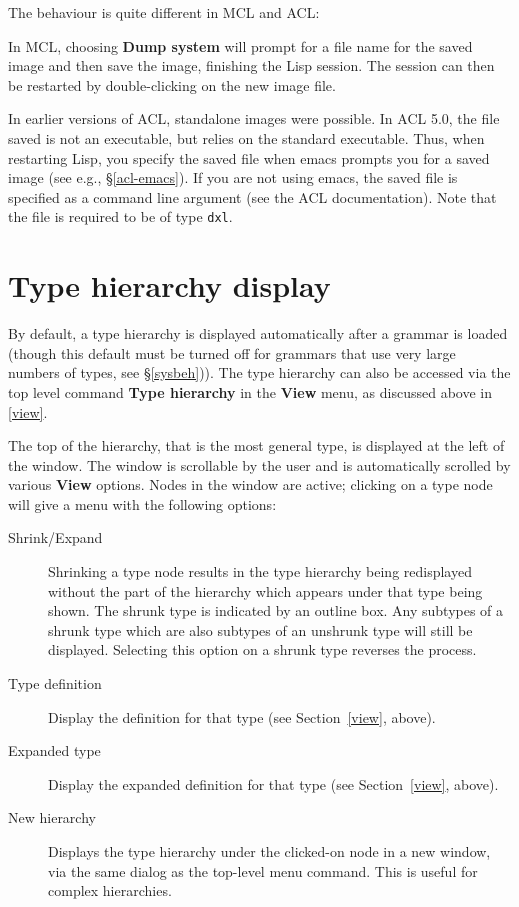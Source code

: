 \documentclass[12pt]{report}
\begin{document}
The behaviour is quite different in MCL and ACL:

In MCL, choosing {\bf Dump system} will prompt for a file name for the saved
image and then save the image, finishing the Lisp session.  
The session can then be restarted by double-clicking on the new image file.

In earlier versions of ACL, standalone images were possible.  In ACL 5.0, the
file saved is not an executable, but relies on the standard executable.  Thus,
when restarting Lisp, you specify the saved file when emacs prompts you for a
saved image (see e.g., \S\ref{acl-emacs}).  If you are not using emacs, the
saved file is specified as a command line argument (see the ACL documentation).
Note that the file is required to be of type {\tt dxl}.


\section{Type hierarchy display}
\label{thier}

By default, a type hierarchy
is displayed automatically after a grammar is loaded 
(though this default must be turned off for grammars that use very
large numbers of types, see \S\ref{sysbeh})).
The type hierarchy
can also be accessed via the top level command {\bf Type hierarchy}
in the {\bf View} menu, as discussed above in \ref{view}.

The top of the hierarchy, that is the most
general type, is displayed at the left of the window.  The window is
scrollable by the user and is automatically scrolled by various {\bf
View} options.  Nodes in the window are active; clicking on a type
node will give a menu with the following options:
\begin{description}
\item[Shrink/Expand] Shrinking a type node results in the type
hierarchy being redisplayed without the part of the hierarchy which
appears under that type being shown.  The shrunk type is indicated by
an outline box.  Any subtypes of a shrunk type which are also subtypes
of an unshrunk type will still be displayed.  Selecting this option on
a shrunk type reverses the process.
\item[Type definition] 
Display the definition for that type (see Section~\ref{view},
above).
\item[Expanded type]
Display the expanded definition for that type (see
Section~\ref{view}, above).
\item[New hierarchy]
Displays the type hierarchy under the clicked-on node in a new
window, via the same dialog as the top-level menu command.
This is useful for complex hierarchies.
\end{description}
\end{document}
